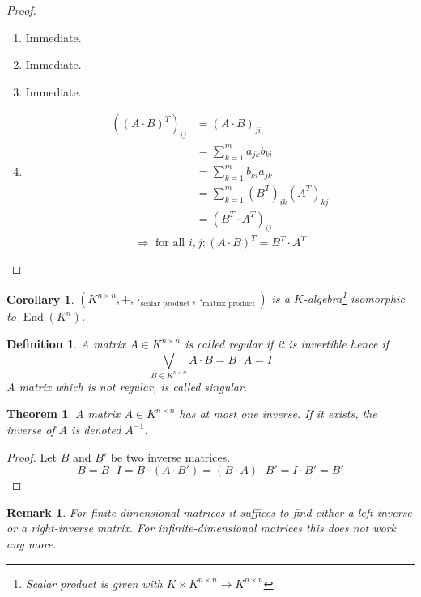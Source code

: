 \documentclass[a4paper,landscape,twocolumn]{article}
\newtheorem{theorem}{Theorem}
\newtheorem{defi}{Definition}
\newtheorem{rem}{Remark}
\newtheorem{cor}{Corollary}
\DeclareMathOperator\End{End} %
\begin{document}
\begin{proof}
  \begin{enumerate}
    \item Immediate.
    \item Immediate.
    \item Immediate.
    \item
      \begin{align*}
        \left((A \cdot B)^T\right)_{ij}
          &= (A \cdot B)_{ji} \\
          &= \sum_{k=1}^m a_{jk} b_{ki} \\
          &= \sum_{k=1}^m b_{ki} a_{jk} \\
          &= \sum_{k=1}^m (B^T)_{ik} (A^T)_{kj} \\
          &= \left(B^T \cdot A^T\right)_{ij}
      \end{align*}
      \[ \Rightarrow \text{ for all } i,j: (A\cdot B)^T = B^T \cdot A^T \]
  \end{enumerate}
\end{proof}
\begin{cor}
  \label{korollar-6.11}
  $(K^{n\times n}, +, \cdot_{\text{scalar product}}, \cdot_{\text{matrix product}})$
  is a $K$-algebra\footnote{Scalar product is given with $K \times K^{n\times n} \to K^{n \times n}$}
  isomorphic to $\End(K^n)$.
\end{cor}
\begin{defi}
  A matrix $A \in K^{n\times n}$ is called \emph{regular} if it is invertible
  hence if
  \[ \bigvee_{B\in K^{n\times n}} A \cdot B = B \cdot A = I \]
  A matrix which is not regular, is called \emph{singular}.
\end{defi}

\begin{theorem}
  \label{satz-6.13}
  A matrix $A \in K^{n\times n}$ has at most one inverse.
  If it exists, the inverse of $A$ is denoted $A^{-1}$.
\end{theorem}
\begin{proof}
  Let $B$ and $B'$ be two inverse matrices.
  \[ B = B \cdot I = B \cdot (A \cdot B') = (B \cdot A) \cdot B' = I \cdot B' = B' \]
\end{proof}
\begin{rem}
  For finite-dimensional matrices it suffices to find either a left-inverse or a right-inverse matrix.
  For infinite-dimensional matrices this does not work any more.
\end{rem}
\end{document}
